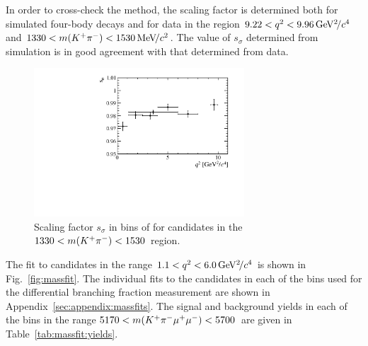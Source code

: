 In order to cross-check the method, the scaling factor is determined both for simulated four-body \BdToKpimm decays and for data in the region $9.22<{q^2}<9.96{\mathrm{\,Ge\kern -0.1em V^2\!/}c^4}$ and $1330<m({{K}^+}{{\pi}^-})<1530{\mathrm{\,Me\kern -0.1em V\!/}c^2}$.  The value of $s_{\sigma}$ determined from simulation is in good agreement with that determined from data.

\begin{figure}[!tb]
 \centering
 \includegraphics[width=0.7\textwidth]{figs/kpimm/massfit/s_sigma.pdf}
 \caption{Scaling factor $s_{\sigma}$ in bins of \qsq for candidates in the $1330<m({{K}^+}{{\pi}^-})<1530$~\mevcc region.
 \label{fig:massfit:scale}}
\end{figure}


 The fit to \BdToKpimm candidates in the range $1.1 < {q^2} < 6.0{\mathrm{\,Ge\kern -0.1em V^2\!/}c^4}$ is shown in Fig.~\ref{fig:massfit}.  The individual fits to the \BdToKpimm candidates in each of the \qsq bins used for the differential branching fraction measurement are shown in Appendix~\ref{sec:appendix:massfits}. The signal and background yields in each of the \qsq bins in the range $5170<m({{K}^+}{{\pi}^-}{\mu^+}{\mu^-})<5700$~\mevcc are given in Table~\ref{tab:massfit:yields}.


